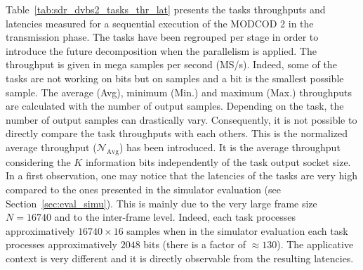 Table~\ref{tab:sdr_dvbs2_tasks_thr_lat} presents the tasks throughputs and
latencies measured for a sequential execution of the MODCOD 2 in the
transmission phase. The tasks have been regrouped per stage in order to
introduce the future decomposition when the parallelism is applied. The
throughput is given in mega samples per second (MS/s). Indeed, some of the tasks
are not working on bits but on samples and a bit is the smallest possible
sample. The average (Avg), minimum (Min.) and maximum (Max.) throughputs are
calculated with the number of output samples. Depending on the task, the number
of output samples can drastically vary. Consequently, it is not possible to
directly compare the task throughputs with each others. This is the normalized
average throughput ($\mathcal{N}_\text{Avg}$) has been introduced. It is the
average throughput considering the $K$ information bits independently of the
task output socket size. In a first observation, one may notice that the
latencies of the tasks are very high compared to the ones presented in the
simulator evaluation (see Section~\ref{sec:eval_simu}). This is mainly due to
the very large frame size $N = 16740$ and to the inter-frame level. Indeed, each
task processes approximatively $16740 \times 16$ samples when in the simulator
evaluation each task processes approximatively $2048$ bits (there is a factor of
$\approx 130$). The applicative context is very different and it is directly
observable from the resulting latencies.

